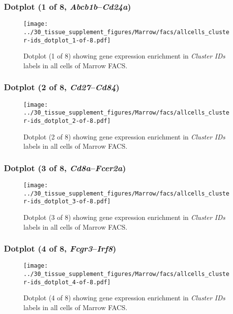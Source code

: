 \clearpage

\subsubsection{Dotplot (1 of 8, \emph{Abcb1b}--\emph{Cd24a})}
\begin{figure}[h]
\centering
\texttt{[image: ../30\_tissue\_supplement\_figures/Marrow/facs/allcells\_cluster-ids\_dotplot\_1-of-8.pdf]}

\caption{ Dotplot (1 of 8)  showing gene expression enrichment in \emph{Cluster IDs} labels in all cells of Marrow FACS. }
\end{figure}


\clearpage

\subsubsection{Dotplot (2 of 8, \emph{Cd27}--\emph{Cd84})}
\begin{figure}[h]
\centering
\texttt{[image: ../30\_tissue\_supplement\_figures/Marrow/facs/allcells\_cluster-ids\_dotplot\_2-of-8.pdf]}

\caption{ Dotplot (2 of 8)  showing gene expression enrichment in \emph{Cluster IDs} labels in all cells of Marrow FACS. }
\end{figure}


\clearpage

\subsubsection{Dotplot (3 of 8, \emph{Cd8a}--\emph{Fcer2a})}
\begin{figure}[h]
\centering
\texttt{[image: ../30\_tissue\_supplement\_figures/Marrow/facs/allcells\_cluster-ids\_dotplot\_3-of-8.pdf]}

\caption{ Dotplot (3 of 8)  showing gene expression enrichment in \emph{Cluster IDs} labels in all cells of Marrow FACS. }
\end{figure}


\clearpage

\subsubsection{Dotplot (4 of 8, \emph{Fcgr3}--\emph{Irf8})}
\begin{figure}[h]
\centering
\texttt{[image: ../30\_tissue\_supplement\_figures/Marrow/facs/allcells\_cluster-ids\_dotplot\_4-of-8.pdf]}

\caption{ Dotplot (4 of 8)  showing gene expression enrichment in \emph{Cluster IDs} labels in all cells of Marrow FACS. }
\end{figure}


